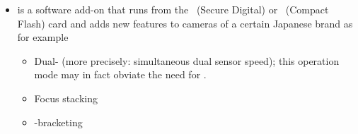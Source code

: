 \begin{itemize}
\item\label{app:magiclantern}  is a software add-on that runs from
  the ~(Secure Digital) or ~(Compact Flash)
  card and adds new features to cameras of a certain Japanese brand as
  for example

  \begin{itemize}
  \item
    Dual- (more precisely: simultaneous dual sensor
    speed); this operation mode may in fact obviate the need for
    .

  \item
    Focus stacking

  \item
    -bracketing
  \end{itemize}
\end{itemize}

